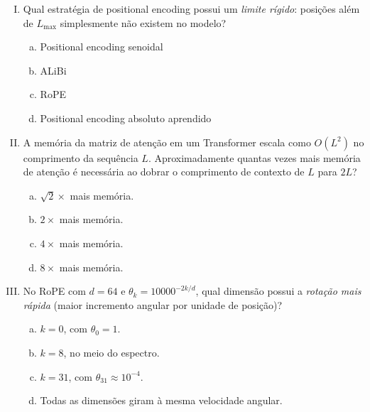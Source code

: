 \documentclass{dlproblemset}
\begin{document}
\begin{enumerate}[I)]
\item Qual estratégia de positional encoding possui um \emph{limite rígido}:
      posições além de $L_{\max}$ simplesmente não existem no modelo?

\begin{enumerate}[a)]
    \item Positional encoding senoidal
    \item ALiBi
    \item RoPE
    \item Positional encoding absoluto aprendido
\end{enumerate}

\item A memória da matriz de atenção em um Transformer escala como $O(L^2)$ no
      comprimento da sequência $L$. Aproximadamente quantas vezes mais memória de
      atenção é necessária ao dobrar o comprimento de contexto de $L$ para $2L$?

\begin{enumerate}[a)]
    \item $\sqrt{2}\times$ mais memória.
    \item $2\times$ mais memória.
    \item $4\times$ mais memória.
    \item $8\times$ mais memória.
\end{enumerate}

\item No RoPE com $d = 64$ e $\theta_k = 10000^{-2k/d}$, qual dimensão possui a
      \emph{rotação mais rápida} (maior incremento angular por unidade de posição)?

\begin{enumerate}[a)]
    \item $k = 0$, com $\theta_0 = 1$.
    \item $k = 8$, no meio do espectro.
    \item $k = 31$, com $\theta_{31} \approx 10^{-4}$.
    \item Todas as dimensões giram à mesma velocidade angular.
\end{enumerate}


\end{enumerate}
\end{document}
